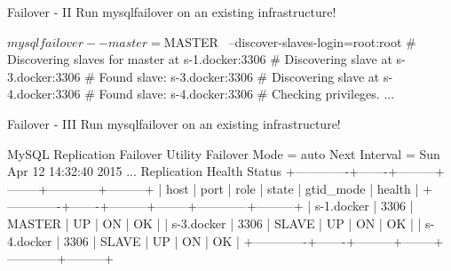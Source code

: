 \documentclass{beamer}[10]
\begin{document}
\begin{pyframe}{Failover - II}
Run mysqlfailover on an existing infrastructure!
\begin{bashcode}
$ mysqlfailover --master=$MASTER \
 --discover-slaves-login=root:root
# Discovering slaves for master at s-1.docker:3306
# Discovering slave at s-3.docker:3306
# Found slave: s-3.docker:3306
# Discovering slave at s-4.docker:3306
# Found slave: s-4.docker:3306
# Checking privileges.
...
\end{bashcode}
\end{pyframe}

\begin{pyframe}{Failover - III}
Run mysqlfailover on an existing infrastructure!

\begin{bashcode}
MySQL Replication Failover Utility
Failover Mode = auto     Next Interval = Sun Apr 12 14:32:40 2015
...
Replication Health Status
+-------------+-------+---------+--------+------------+---------+
| host        | port  | role    | state  | gtid_mode  | health  |
+-------------+-------+---------+--------+------------+---------+
| s-1.docker  | 3306  | MASTER  | UP     | ON         | OK      |
| s-3.docker  | 3306  | SLAVE   | UP     | ON         | OK      |
| s-4.docker  | 3306  | SLAVE   | UP     | ON         | OK      |
+-------------+-------+---------+--------+------------+---------+
\end{bashcode}
\end{pyframe}



%
%
\end{document}
